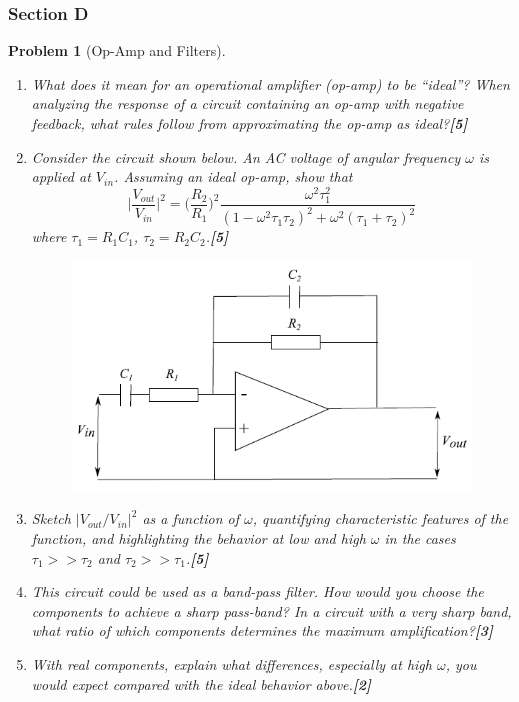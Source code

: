 \documentclass[a4paper]{article}
\theoremstyle{new}
\newtheorem{qns}{Problem}[subsection]
\begin{document}
\subsubsection{Section D}
\begin{qns}[Op-Amp and Filters]\leavevmode
\begin{enumerate}[label=(\roman*)]
\item What does it mean for an operational amplifier (op-amp) to be “ideal”? When analyzing the response of a circuit containing an op-amp with negative feedback, what rules follow from approximating the op-amp as ideal?\hfill\textbf{[5]}
\item Consider the circuit shown below. An AC voltage of angular frequency $\omega$ is applied at $V_{in}$. Assuming an ideal op-amp, show that
$$\bigg|\frac{V_{out}}{V_{in}}\bigg|^2=\bigg(\frac{R_2}{R_1}\bigg)^2\frac{\omega^2\tau_1^2}{(1-\omega^2\tau_1\tau_2)^2+\omega^2(\tau_1+\tau_2)^2}$$
where $\tau_1=R_1C_1$, $\tau_2=R_2C_2$.\hfill\textbf{[5]}
\begin{figure}[H]
    \centering
    \includegraphics[scale=0.75]{2013P1D12Q.PNG}
\end{figure}
\item Sketch $|V_{out}/V_{in}|^2$ as a function of $\omega$, quantifying characteristic features of the function, and highlighting the behavior at low and high $\omega$ in the cases $\tau_1>>\tau_2$ and $\tau_2>>\tau_1$.\hfill\textbf{[5]}
\item This circuit could be used as a band-pass filter. How would you choose the components to achieve a sharp pass-band? In a circuit with a very sharp band, what ratio of which components determines the maximum amplification?\hfill\textbf{[3]}
\item With real components, explain what differences, especially at high $\omega$, you would expect compared with the ideal behavior above.\hfill\textbf{[2]}
\end{enumerate}
\end{qns}
\end{document}
